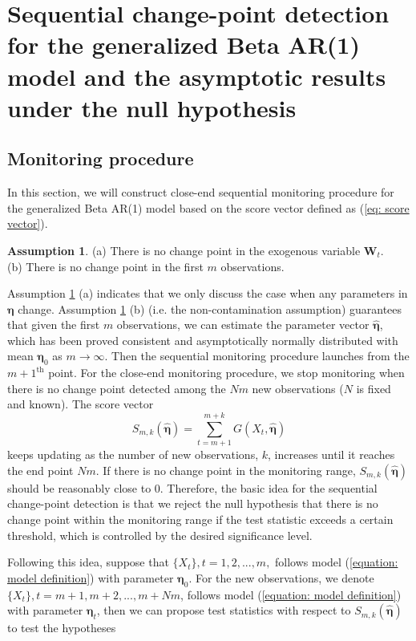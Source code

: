 \documentclass{article}
\theoremstyle{definition}
\newtheorem{assumption}{Assumption}
\begin{document}
\section{Sequential change-point detection for the generalized Beta AR(1) model and the asymptotic results under the null hypothesis}
\label{sec: monitoring scheme and null}
\subsection{Monitoring procedure}
In this section, we will construct close-end sequential monitoring procedure for the generalized Beta AR(1) model based on the score vector defined as (\ref{eq: score vector}). 
\begin{assumption}
\label{assumption: no contamination assumptions}
(a) There is no change point in the exogenous variable $\bm{W}_t$. \\
(b) There is no change point in the first $m$ observations. 
\end{assumption}
Assumption \ref{assumption: no contamination assumptions} (a) indicates that we only discuss the case when any parameters in $\bm{\eta}$ change. Assumption \ref{assumption: no contamination assumptions} (b) (i.e. the non-contamination assumption) guarantees that given the first $m$ observations, we can estimate the parameter vector $\hat{\bm{\eta}}$, which has been proved consistent and asymptotically normally distributed with mean $\bm{\eta}_0$ as $m \rightarrow \infty$. Then the sequential monitoring procedure launches from the $m+1^{\text{th}}$ point. For the close-end monitoring procedure, we stop monitoring when there is no change point detected among the $Nm$ new observations ($N$ is fixed and known). The score vector 
\begin{equation*}
    S_{m,k}(\hat{\bm{\eta}}) = \sum_{t=m+1}^{m+k} G(X_t,\hat{\bm{\eta}})
\end{equation*}
keeps updating as the number of new observations, $k$, increases until it reaches the end point $Nm$. If there is no change point in the monitoring range, $S_{m,k}(\hat{\bm{\eta}})$ should be reasonably close to 0. Therefore, the basic idea for the sequential change-point detection is that we reject the null hypothesis that there is no change point within the monitoring range if the test statistic exceeds a certain threshold, which is controlled by the desired significance level.

Following this idea, suppose that $\{X_t\},t=1,2,...,m,$ follows model (\ref{equation: model definition}) with parameter $\bm{\eta}_0$. For the new observations, we denote $\{X_t\}, t=m+1,m+2,...,m+Nm$, follows model (\ref{equation: model definition}) with parameter $\bm{\eta}_t$, then we can propose test statistics with respect to $S_{m,k}(\hat{\bm{\eta}})$ to test the hypotheses
\\
\end{document}
